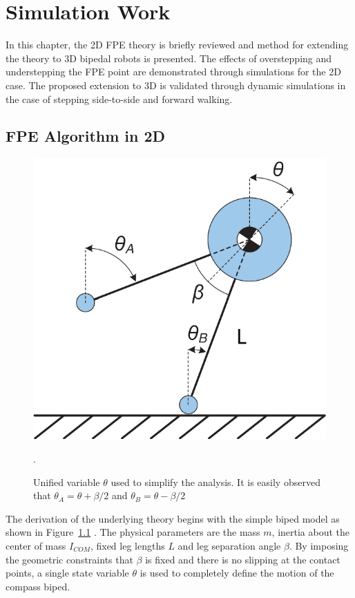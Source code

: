\chapter{Simulation Work} %
\label{cha:simulations}

In this chapter, the 2D FPE theory is briefly reviewed and method for extending the theory to 3D bipedal robots is presented. The effects of overstepping and understepping the FPE point are demonstrated through simulations for the 2D case. The proposed extension to 3D is validated through dynamic simulations in the case of stepping side-to-side and forward walking. 

\section{FPE Algorithm in 2D} %
\label{sec:foot_placement_estimator_in_2d}

\begin{figure}[!h]
	\centering
    \includegraphics[scale=0.7]{fig/ch4/compass.pdf}
  	\caption{Unified variable $\theta$ used to simplify the analysis. It is easily observed that $\theta_A = \theta  + \beta /2$ and $\theta_B = \theta  - \beta /2$}.
	\label{fig:unified}
\end{figure}

The derivation of the underlying theory begins with the simple biped model as shown in Figure~\ref{fig:unified} \cite{Wight:2008ii}. The physical parameters are the mass $m$, inertia about the center of mass $I_{COM}$, fixed leg lengths $L$ and leg separation angle $\beta$. By imposing the geometric constraints that $\beta$ is fixed and there is no slipping at the contact points, a single state variable $\theta$ is used to completely define the motion of the compass biped.

